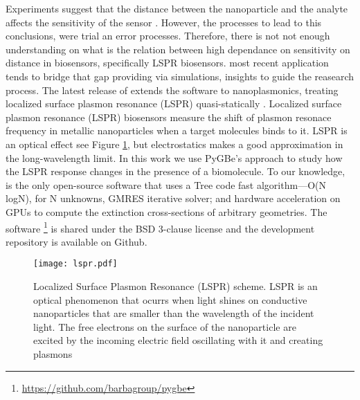 






Experiments suggest that the distance between the nanoparticle and the analyte 
affects the sensitivity of the sensor \cite{HaesETal2004}. However, the processes 
to lead to this conclusions, were trial an error processes. Therefore, there is not
not enough understanding on what is the relation between high dependance on 
sensitivity on distance in biosensors, specifically LSPR biosensors. \pygbe most
recent application \cite{ClementiETal2017} tends to 
bridge that gap providing via simulations, insights to guide the reasearch process.
The latest release of \pygbe extends the software to nanoplasmonics, treating 
localized surface plasmon resonance (LSPR) quasi-statically \cite{MayergoyzZhang2007}.
Localized surface plasmon resonance (LSPR) biosensors measure the shift of 
plasmon resonace frequency in metallic nanoparticles when a target molecules 
binds to it. LSPR is an optical effect see Figure \ref{fig:lspr}, but electrostatics 
makes a good approximation in the long-wavelength limit. In this work we use
PyGBe's approach to study how the LSPR response changes in the presence of a 
biomolecule. To our knowledge, \pygbe is the only open-source software that uses a Tree code 
fast algorithm—O(N logN), for N unknowns, GMRES iterative solver; and hardware 
acceleration on GPUs to compute the extinction cross-sections of arbitrary 
geometries. The software \footnote{\url{https://github.com/barbagroup/pygbe}} is shared 
under the BSD 3-clause license and the development repository is available on 
Github.



\begin{figure}[h] %
   \centering
   \texttt{[image: lspr.pdf]} 
   \caption{Localized Surface Plasmon Resonance (LSPR) scheme. LSPR is an 
            optical phenomenon that ocurrs when light shines on conductive 
            nanoparticles that are smaller than the wavelength of the incident 
            light. The free electrons on the surface of the nanoparticle are 
            excited by the incoming electric field oscillating with it and 
            creating plasmons}
   \label{fig:lspr}
\end{figure}


